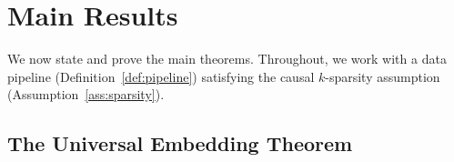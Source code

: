 \documentclass[11pt,a4paper]{article}
\theoremstyle{plain}
\theoremstyle{definition}
\theoremstyle{remark}
\begin{document}
\section{Main Results}\label{sec:main-results}

We now state and prove the main theorems.  Throughout, we work with a data
pipeline (Definition~\ref{def:pipeline}) satisfying the causal $k$-sparsity
assumption (Assumption~\ref{ass:sparsity}).

\subsection{The Universal Embedding Theorem}\label{sec:main-thm}
\end{document}
